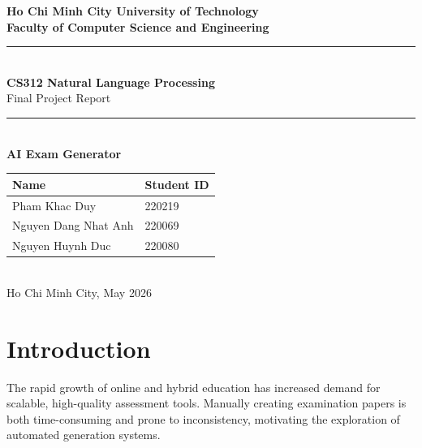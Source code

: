 \documentclass[12pt, a4paper]{article}
\begin{document}
\begin{titlepage}
  \thispagestyle{empty}
  \centering
  \vspace*{1.5cm}

  {\Large\bfseries Ho Chi Minh City University of Technology\\[0.4em]
  Faculty of Computer Science and Engineering}\\[1.2cm]

  \rule{\linewidth}{1.5pt}\\[0.4cm]
  {\LARGE\bfseries CS312 Natural Language Processing}\\[0.3cm]
  {\large Final Project Report}\\[0.2cm]
  \rule{\linewidth}{1.5pt}\\[1.5cm]

  {\Huge\bfseries AI Exam Generator}\\[2cm]

  \begin{tabular}{ll}
    \toprule
    \textbf{Name} & \textbf{Student ID} \\
    \midrule
    Pham Khac Duy   & 220219 \\
    Nguyen Dang Nhat Anh & 220069 \\
    Nguyen Huynh Duc     & 220080 \\
    \bottomrule
  \end{tabular}\\[2cm]

  {\large Ho Chi Minh City, May 2026}
  \vfill
\end{titlepage}

\newpage
\thispagestyle{fancy}
\tableofcontents
\newpage

\section{Introduction}

The rapid growth of online and hybrid education has increased demand for scalable, high-quality assessment tools. Manually creating examination papers is both time-consuming and prone to inconsistency, motivating the exploration of automated generation systems.
\end{document}
